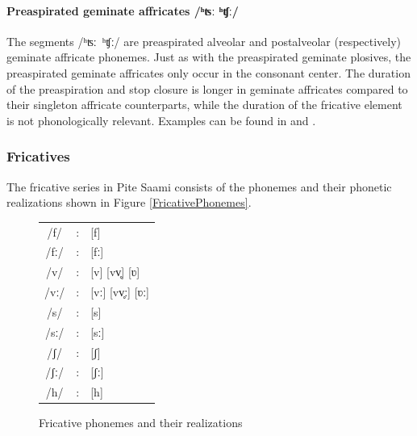 \paragraph{Preaspirated geminate affricates /ʰʦː ʰʧː/}
The segments \mbox{/ʰʦː ʰʧː/} are preaspirated alveolar and postalveolar (respectively) geminate affricate phonemes. 
Just as with the preaspirated geminate plosives, the preaspirated geminate affricates only occur in the consonant center. The duration of the preaspiration and stop closure is longer in geminate affricates compared to their singleton affricate counterparts, while the duration of the fricative element is not phonologically relevant. 
Examples can be found in  and .


\subsubsection{Fricatives}\label{Fricatives}
The fricative series in Pite Saami consists of the phonemes and their phonetic realizations shown in Figure \vref{FricativePhonemes}. %
\begin{figure}\centering
\begin{tabular}{c c l}
/f/ &:& [f] \\ %
/fː/ &:& [fː] \\ %
/v/ &:& [v] [vv̥] [ʋ] \\ %
/vː/ &:& [vː] [vv̥ː] [ʋː] \\ %
/s/ &:& [s] \\ %
/sː/ &:& [sː] \\ %
/ʃ/ &:& [ʃ] \\ %
/ʃː/ &:& [ʃː] \\ %
/h/ &:& [h] \\ %
\end{tabular}
\caption{Fricative phonemes and their realizations}\label{FricativePhonemes}
\end{figure}

